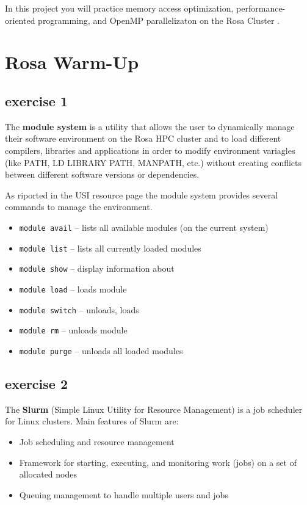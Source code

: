 \documentclass[unicode,11pt,a4paper,oneside,numbers=endperiod,openany]{scrartcl}
\begin{document}
\setassignment

\newline

\assignmentpolicy
In this project you will practice memory access optimization, performance-oriented programming, and OpenMP parallelizaton 
on the Rosa Cluster .  

\tableofcontents
\newpage

\section{Rosa Warm-Up }

\subsection{exercise 1}
The \textbf{module system} is a utility that allows the user to dynamically manage their software environment on the Rosa HPC cluster and to load different compilers, libraries and applications in order to modify environment variagles (like PATH, LD LIBRARY PATH, MANPATH, etc.) without creating conflicts between different software versions or dependencies.    

As riported in the USI resource page the module system provides several commands to manage the environment.

\begin{itemize}
    \item \texttt{module avail} -- lists all available modules (on the current system)
    \item \texttt{module list} -- lists all currently loaded modules
    \item \texttt{module show} -- display information about
    \item \texttt{module load} -- loads module
    \item \texttt{module switch} -- unloads, loads
    \item \texttt{module rm} -- unloads module
    \item \texttt{module purge} -- unloads all loaded modules
\end{itemize}

\subsection{exercise 2}
The \textbf{Slurm} (Simple Linux Utility for Resource Management) is a job scheduler for Linux clusters.
Main features of Slurm are:
\begin{itemize}
    \item Job scheduling and resource management
    \item Framework for starting, executing, and monitoring work (jobs) on a set of allocated nodes
    \item Queuing management to handle multiple users and jobs
\end{itemize}
\end{document}
